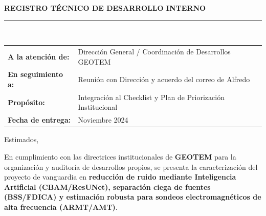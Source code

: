 \documentclass[11pt,letterpaper]{article}
\begin{document}
\begin{tcolorbox}[
    colback=lightGray,
    colframe=geotemBlue,
    arc=2mm,
    boxrule=1pt,
    left=14pt, right=14pt, top=10pt, bottom=10pt
]
    {\LARGE \textbf{\textcolor{geotemBlue}{REGISTRO TÉCNICO DE DESARROLLO INTERNO}}}\\[4pt]
    \noindent\textcolor{geotemPurple}{\rule{\textwidth}{1.5pt}}\\[6pt]
    \begin{tabular}{ll}
        \textbf{A la atención de:} & Dirección General / Coordinación de Desarrollos GEOTEM \\
        \textbf{En seguimiento a:} & Reunión con Dirección y acuerdo del correo de Alfredo \\
        \textbf{Propósito:}        & Integración al Checklist y Plan de Priorización Institucional \\
        \textbf{Fecha de entrega:} & Noviembre 2024
    \end{tabular}
\end{tcolorbox}

\vspace{0.6em}

\noindent Estimados,

\vspace{0.4em}
En cumplimiento con las directrices institucionales de \textbf{GEOTEM} para la organización y auditoría de desarrollos propios, se presenta la caracterización del proyecto de vanguardia en \textbf{reducción de ruido mediante Inteligencia Artificial (CBAM/ResUNet), separación ciega de fuentes (BSS/FDICA) y estimación robusta para sondeos electromagnéticos de alta frecuencia (ARMT/AMT)}.

\vspace{0.8em}
\end{document}
